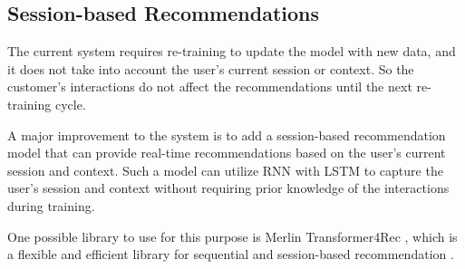 \subsection{Session-based Recommendations}

The current system requires re-training to update the model with new data, and it does not take into account the user's current session or context.
So the customer's interactions do not affect the recommendations until the next re-training cycle.

A major improvement to the system is to add a session-based recommendation model that can provide real-time recommendations based on the user's current session and context.
Such a model can utilize RNN with LSTM to capture the user's session and context without requiring prior knowledge of the interactions during training. 

One possible library to use for this purpose is Merlin Transformer4Rec \cite{NvidiaMerlinTransformers4Rec}, 
which is a flexible and efficient library for sequential and session-based recommendation \cite{NvidiaMerlinTransformers4Rec}.

